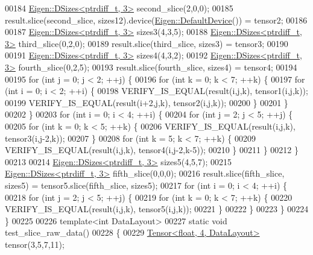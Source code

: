 \begin{DoxyCode}
00184   \hyperlink{struct_eigen_1_1_d_sizes}{Eigen::DSizes<ptrdiff\_t, 3>} second\_slice(2,0,0);
00185   result.slice(second\_slice, sizes12).device(\hyperlink{struct_eigen_1_1_default_device}{Eigen::DefaultDevice}()) = tensor2;
00186 
00187   \hyperlink{struct_eigen_1_1_d_sizes}{Eigen::DSizes<ptrdiff\_t, 3>} sizes3(4,3,5);
00188   \hyperlink{struct_eigen_1_1_d_sizes}{Eigen::DSizes<ptrdiff\_t, 3>} third\_slice(0,2,0);
00189   result.slice(third\_slice, sizes3) = tensor3;
00190 
00191   \hyperlink{struct_eigen_1_1_d_sizes}{Eigen::DSizes<ptrdiff\_t, 3>} sizes4(4,3,2);
00192   \hyperlink{struct_eigen_1_1_d_sizes}{Eigen::DSizes<ptrdiff\_t, 3>} fourth\_slice(0,2,5);
00193   result.slice(fourth\_slice, sizes4) = tensor4;
00194 
00195   \textcolor{keywordflow}{for} (\textcolor{keywordtype}{int} j = 0; j < 2; ++j) \{
00196     \textcolor{keywordflow}{for} (\textcolor{keywordtype}{int} k = 0; k < 7; ++k) \{
00197       \textcolor{keywordflow}{for} (\textcolor{keywordtype}{int} i = 0; i < 2; ++i) \{
00198         VERIFY\_IS\_EQUAL(result(i,j,k), tensor1(i,j,k));
00199         VERIFY\_IS\_EQUAL(result(i+2,j,k), tensor2(i,j,k));
00200       \}
00201     \}
00202   \}
00203   \textcolor{keywordflow}{for} (\textcolor{keywordtype}{int} i = 0; i < 4; ++i) \{
00204     \textcolor{keywordflow}{for} (\textcolor{keywordtype}{int} j = 2; j < 5; ++j) \{
00205       \textcolor{keywordflow}{for} (\textcolor{keywordtype}{int} k = 0; k < 5; ++k) \{
00206         VERIFY\_IS\_EQUAL(result(i,j,k), tensor3(i,j-2,k));
00207       \}
00208       \textcolor{keywordflow}{for} (\textcolor{keywordtype}{int} k = 5; k < 7; ++k) \{
00209         VERIFY\_IS\_EQUAL(result(i,j,k), tensor4(i,j-2,k-5));
00210       \}
00211     \}
00212   \}
00213 
00214   \hyperlink{struct_eigen_1_1_d_sizes}{Eigen::DSizes<ptrdiff\_t, 3>} sizes5(4,5,7);
00215   \hyperlink{struct_eigen_1_1_d_sizes}{Eigen::DSizes<ptrdiff\_t, 3>} fifth\_slice(0,0,0);
00216   result.slice(fifth\_slice, sizes5) = tensor5.slice(fifth\_slice, sizes5);
00217   \textcolor{keywordflow}{for} (\textcolor{keywordtype}{int} i = 0; i < 4; ++i) \{
00218     \textcolor{keywordflow}{for} (\textcolor{keywordtype}{int} j = 2; j < 5; ++j) \{
00219       \textcolor{keywordflow}{for} (\textcolor{keywordtype}{int} k = 0; k < 7; ++k) \{
00220         VERIFY\_IS\_EQUAL(result(i,j,k), tensor5(i,j,k));
00221       \}
00222     \}
00223   \}
00224 \}
00225 
00226 \textcolor{keyword}{template}<\textcolor{keywordtype}{int} DataLayout>
00227 \textcolor{keyword}{static} \textcolor{keywordtype}{void} test\_slice\_raw\_data()
00228 \{
00229   \hyperlink{class_eigen_1_1_tensor}{Tensor<float, 4, DataLayout>} tensor(3,5,7,11);

\end{DoxyCode}
